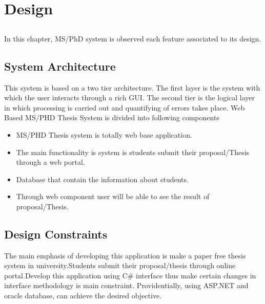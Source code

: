 \chapter{Design} \label{chap:design}


\section*{}

In this chapter, MS/PhD system is observed each feature associated to its design.

\section{System Architecture}
This system is based on a two tier architecture. The first layer is the system with which the user interacts through a rich GUI. The second tier is the logical layer in which processing is carried out and quantifying of errors takes place.
Web Based MS/PHD Thesis System is divided into following components
\begin{itemize}
\item MS/PHD Thesis system is totally web base application.
\item The main functionality is system is students submit their proposal/Thesis through a web portal.
\item Database that contain the information about students.
\item Through web component user will be able to see the result of proposal/Thesis.
\end{itemize}

\section{Design Constraints}
The main emphasis of developing this application is make a paper free thesis system in university.Students submit their proposal/thesis through online portal.Develop this application using C\# interface thus make certain changes in interface methodology is main constraint. Providentially, using ASP.NET and oracle database, can achieve the desired objective.

